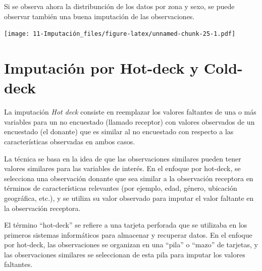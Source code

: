 \documentclass[
  12pt,
]{book}
\newenvironment{Shaded}{\begin{snugshade}}{\end{snugshade}}
\newcommand{\AttributeTok}[1]{\textcolor[rgb]{0.77,0.63,0.00}{#1}}
\newcommand{\FunctionTok}[1]{\textcolor[rgb]{0.00,0.00,0.00}{#1}}
\newcommand{\NormalTok}[1]{#1}
\newcommand{\OtherTok}[1]{\textcolor[rgb]{0.56,0.35,0.01}{#1}}
\newcommand{\SpecialCharTok}[1]{\textcolor[rgb]{0.00,0.00,0.00}{#1}}
\newcommand{\StringTok}[1]{\textcolor[rgb]{0.31,0.60,0.02}{#1}}
\begin{document}
Si se observa ahora la distribunción de los datos por zona y sexo, se puede observar también una buena imputación de las observaciones.

\begin{Shaded}
\end{Shaded}

\texttt{[image: 11-Imputación\_files/figure-latex/unnamed-chunk-25-1.pdf]}

\hypertarget{imputaciuxf3n-por-hot-deck-y-cold-deck}{%
\section{Imputación por Hot-deck y Cold-deck}\label{imputaciuxf3n-por-hot-deck-y-cold-deck}}

La imputación \emph{Hot deck} consiste en reemplazar los valores faltantes de una o más variables para un no encuestado (llamado receptor) con valores observados de un encuestado (el donante) que es similar al no encuestado con respecto a las características observadas en ambos casos.

La técnica se basa en la idea de que las observaciones similares pueden tener valores similares para las variables de interés. En el enfoque por hot-deck, se selecciona una observación donante que sea similar a la observación receptora en términos de características relevantes (por ejemplo, edad, género, ubicación geográfica, etc.), y se utiliza su valor observado para imputar el valor faltante en la observación receptora.

El término ``hot-deck'' se refiere a una tarjeta perforada que se utilizaba en los primeros sistemas informáticos para almacenar y recuperar datos. En el enfoque por hot-deck, las observaciones se organizan en una ``pila'' o ``mazo'' de tarjetas, y las observaciones similares se seleccionan de esta pila para imputar los valores faltantes.
\end{document}
